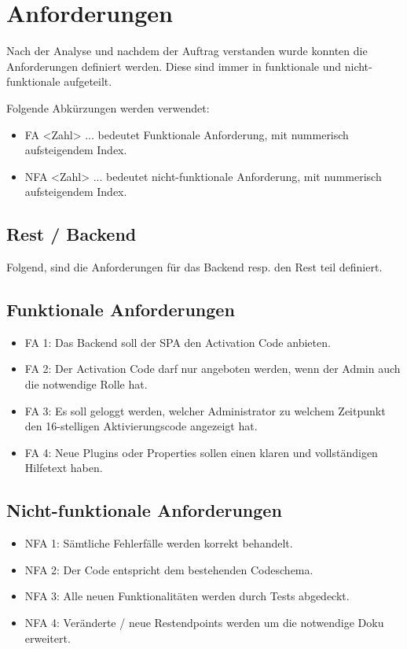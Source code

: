 \section{Anforderungen}
Nach der Analyse und nachdem der Auftrag verstanden wurde konnten die Anforderungen definiert werden. Diese sind immer in funktionale und nicht-funktionale aufgeteilt.

Folgende Abkürzungen werden verwendet:
\begin{itemize}
	\item FA <Zahl> ... bedeutet Funktionale Anforderung, mit nummerisch aufsteigendem Index.
	\item NFA <Zahl> ... bedeutet nicht-funktionale Anforderung, mit nummerisch aufsteigendem Index.
\end{itemize}

\subsection{Rest / Backend}

Folgend, sind die Anforderungen für das Backend resp. den Rest teil definiert.

\subsection*{Funktionale Anforderungen}
\begin{itemize}
	\item FA 1: Das Backend soll der SPA den Activation Code anbieten.
	\item FA 2: Der Activation Code darf nur angeboten werden, wenn der Admin auch die notwendige Rolle hat.
	\item FA 3: Es soll geloggt werden, welcher Administrator zu welchem Zeitpunkt den 16-stelligen Aktivierungscode angezeigt hat.
	\item FA 4: Neue Plugins oder Properties sollen einen klaren und vollständigen Hilfetext haben.
\end{itemize}

\subsection*{Nicht-funktionale Anforderungen}
\begin{itemize}
	\item NFA 1: Sämtliche Fehlerfälle werden korrekt behandelt.
	\item NFA 2: Der Code entspricht dem bestehenden Codeschema.
	\item NFA 3: Alle neuen Funktionalitäten werden durch Tests abgedeckt.
	\item NFA 4: Veränderte / neue Restendpoints werden um die notwendige Doku erweitert.
\end{itemize}

